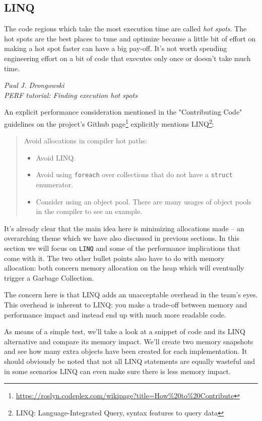 \subsection{LINQ}
\label{sec:linq}

\epigraph{The code regions which take the most execution time are called \textit{hot spots}. The hot spots are the best places to tune and optimize because a little bit of effort on making a hot spot faster can have a big pay-off. It’s not worth spending engineering effort on a bit of code that executes only once or doesn’t take much time.}
{\textit{Paul J. Drongowski \\ \footnotesize{PERF tutorial: Finding execution hot spots\protect\footnotemark}}}


An explicit performance consideration mentioned in the "Contributing Code" guidelines on the project's Github page\footnote{\url{https://roslyn.codeplex.com/wikipage?title=How\%20to\%20Contribute}} explicitly mentions LINQ\footnote{LINQ: Language-Integrated Query, syntax features to query data}:

\begin{quote}
Avoid allocations in compiler hot paths:
\begin{itemize}
\item Avoid LINQ.
\item Avoid using \texttt{foreach} over collections that do not have a \texttt{struct} enumerator.
\item Consider using an object pool. There are many usages of object pools in the compiler to see an example.
\end{itemize}
\end{quote}

It's already clear that the main idea here is minimizing allocations made -- an overarching theme which we have also discussed in previous sections. In this section we will focus on \texttt{LINQ} and some of the performance implications that come with it. The two other bullet points also have to do with memory allocation: both concern memory allocation on the heap which will eventually trigger a Garbage Collection.

The concern here is that LINQ adds an unacceptable overhead in the team's eyes. This overhead is inherent to LINQ: you make a trade-off between memory and performance impact and instead end up with much more readable code. 

As means of a simple test, we'll take a look at a snippet of code and its LINQ alternative and compare its memory impact. We'll create two memory snapshots and see how many extra objects have been created for each implementation. It should obviously be noted that not all LINQ statements are equally wasteful and in some scenarios LINQ can even make sure there is less memory impact. 

